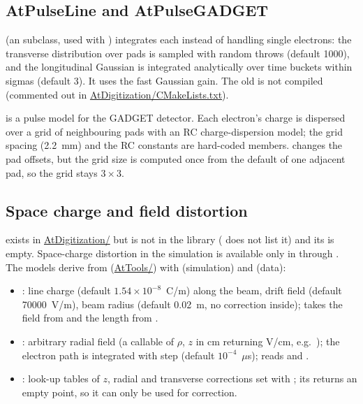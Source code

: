 \subsection{AtPulseLine and AtPulseGADGET}

 (an  subclass, used with ) integrates each
 instead of handling single electrons: the transverse distribution over pads is
sampled with  random throws (default 1000), and the longitudinal
Gaussian is integrated analytically over time buckets within  sigmas
(default 3). It uses the fast Gaussian gain. The old  is not compiled
(commented out in \url{AtDigitization/CMakeLists.txt}).

 is a pulse model for the GADGET detector. Each electron's charge is dispersed
over a grid of neighbouring pads with an RC charge-dispersion model; the grid spacing (2.2~mm) and
the RC constants are hard-coded members.  changes the pad offsets, but the
grid size  is computed once from the default of one adjacent pad, so the grid stays
$3\times3$.

\subsection{Space charge and field distortion}

 exists in \url{AtDigitization/} but is not in the library
( does not list it) and its  is empty. Space-charge
distortion in the simulation is available only in  through
. The models derive from 
(\url{AtTools/}) with  (simulation) and  (data):

\begin{itemize}
  \item {}: line charge  (default $1.54\times10^{-8}$~C/m)
    along the beam, drift field  (default 70000~V/m), beam radius
     (default 0.02~m, no correction inside);  takes the
    field from  and the length from .
  \item {}: arbitrary radial field (a callable of $\rho$, $z$ in cm returning
    V/cm, e.g.\ ); the electron path is integrated with step
     (default $10^{-4}$~$\mu$s);  reads  and
    .
  \item {}: look-up tables of $z$, radial and transverse corrections
    set with ; its  returns an empty point, so it can only
    be used for correction.
\end{itemize}

